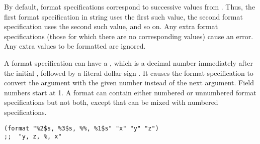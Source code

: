 By default, format specifications correspond to successive values from .
Thus, the first format specification in string uses the first such value, the second format specification uses the second such value, and so on.
Any extra format specifications (those for which there are no corresponding values) cause an error.
Any extra values to be formatted are ignored.


A format specification can have a , which is a decimal number immediately after the initial \argument{\%}, followed by a literal dollar sign \argument{\$}.
It causes the format specification to convert the argument with the given number instead of the next argument.
Field numbers start at 1.
A format can contain either numbered or unnumbered format specifications but not both, except that \argument{\%\%} can be mixed with numbered specifications.
\begin{lstlisting}
(format "%2$s, %3$s, %%, %1$s" "x" "y" "z")
;;  "y, z, %, x"
\end{lstlisting}




